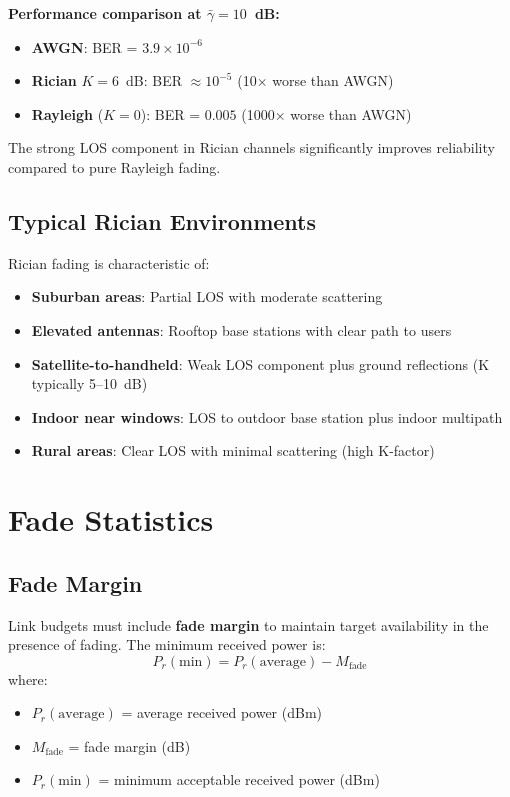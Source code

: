 \textbf{Performance comparison at $\bar{\gamma} = 10$~dB:}
\begin{itemize}
\item \textbf{AWGN}: BER = $3.9 \times 10^{-6}$
\item \textbf{Rician} $K=6$~dB: BER $\approx 10^{-5}$ (10× worse than AWGN)
\item \textbf{Rayleigh} ($K=0$): BER = $0.005$ (1000× worse than AWGN)
\end{itemize}

The strong LOS component in Rician channels significantly improves reliability compared to pure Rayleigh fading.

\subsection{Typical Rician Environments}

Rician fading is characteristic of:
\begin{itemize}
\item \textbf{Suburban areas}: Partial LOS with moderate scattering
\item \textbf{Elevated antennas}: Rooftop base stations with clear path to users
\item \textbf{Satellite-to-handheld}: Weak LOS component plus ground reflections (K typically 5--10~dB)
\item \textbf{Indoor near windows}: LOS to outdoor base station plus indoor multipath
\item \textbf{Rural areas}: Clear LOS with minimal scattering (high K-factor)
\end{itemize}

\section{Fade Statistics}

\subsection{Fade Margin}

Link budgets must include \textbf{fade margin} to maintain target availability in the presence of fading. The minimum received power is:
\begin{equation}
P_r(\text{min}) = P_r(\text{average}) - M_{\text{fade}}
\end{equation}
where:
\begin{itemize}
\item $P_r(\text{average})$ = average received power (dBm)
\item $M_{\text{fade}}$ = fade margin (dB)
\item $P_r(\text{min})$ = minimum acceptable received power (dBm)
\end{itemize}

